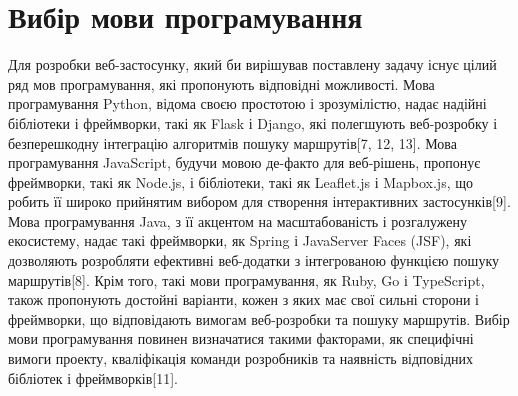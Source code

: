 \section{Вибір мови програмування}
\label{sec:programming-language}

Для розробки веб-застосунку, який би вирішував поставлену задачу існує цілий ряд мов програмування, які пропонують відповідні можливості. Мова програмування Python, відома своєю простотою і зрозумілістю, надає надійні бібліотеки і фреймворки, такі як Flask і Django, які полегшують веб-розробку і безперешкодну інтеграцію алгоритмів пошуку маршрутів[7, 12, 13]. Мова програмування JavaScript, будучи мовою де-факто для веб-рішень, пропонує фреймворки, такі як Node.js, і бібліотеки, такі як Leaflet.js і Mapbox.js, що робить її широко прийнятим вибором для створення інтерактивних застосунків[9]. Мова програмування Java, з її акцентом на масштабованість і розгалужену екосистему, надає такі фреймворки, як Spring і JavaServer Faces (JSF), які дозволяють розробляти ефективні веб-додатки з інтегрованою функцією пошуку маршрутів[8]. Крім того, такі мови програмування, як Ruby, Go і TypeScript, також пропонують достойні варіанти, кожен з яких має свої сильні сторони і фреймворки, що відповідають вимогам веб-розробки та пошуку маршрутів. Вибір мови програмування повинен визначатися такими факторами, як специфічні вимоги проекту, кваліфікація команди розробників та наявність відповідних бібліотек і фреймворків[11].










